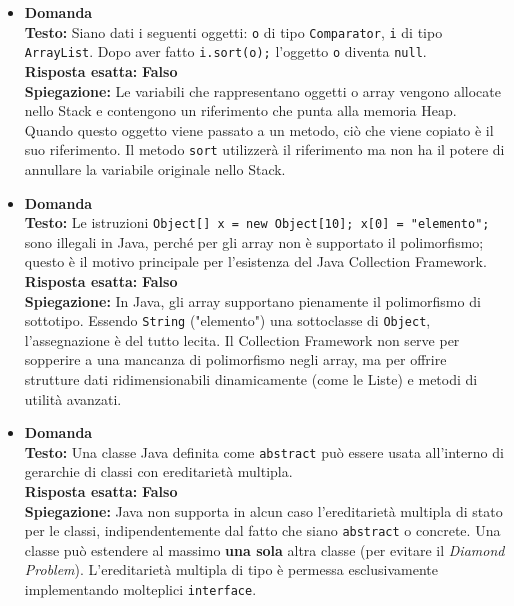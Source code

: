 \documentclass[12pt, a4paper]{article}
\begin{document}
\begin{itemize}
    \item {}\textbf{Domanda \thedomanda} \\
    \textbf{Testo:} Siano dati i seguenti oggetti: \texttt{o} di tipo \texttt{Comparator}, \texttt{i} di tipo \texttt{ArrayList}. Dopo aver fatto \texttt{i.sort(o);} l'oggetto \texttt{o} diventa \texttt{null}. \\
    \textbf{Risposta esatta:} \textbf{Falso} \\
    \textbf{Spiegazione:} Le variabili che rappresentano oggetti o array vengono allocate nello Stack e contengono un riferimento che punta alla memoria Heap. Quando questo oggetto viene passato a un metodo, ciò che viene copiato è il suo riferimento. Il metodo \texttt{sort} utilizzerà il riferimento ma non ha il potere di annullare la variabile originale nello Stack.
    \vspace{0.3cm}

    \item {}\textbf{Domanda \thedomanda} \\
    \textbf{Testo:} Le istruzioni \texttt{Object[] x = new Object[10]; x[0] = "elemento";} sono illegali in Java, perché per gli array non è supportato il polimorfismo; questo è il motivo principale per l'esistenza del Java Collection Framework. \\
    \textbf{Risposta esatta:} \textbf{Falso} \\
    \textbf{Spiegazione:} In Java, gli array supportano pienamente il polimorfismo di sottotipo. Essendo \texttt{String} ("elemento") una sottoclasse di \texttt{Object}, l'assegnazione è del tutto lecita. Il Collection Framework non serve per sopperire a una mancanza di polimorfismo negli array, ma per offrire strutture dati ridimensionabili dinamicamente (come le Liste) e metodi di utilità avanzati.
    \vspace{0.3cm}

    \item {}\textbf{Domanda \thedomanda} \\
    \textbf{Testo:} Una classe Java definita come \texttt{abstract} può essere usata all'interno di gerarchie di classi con ereditarietà multipla. \\
    \textbf{Risposta esatta:} \textbf{Falso} \\
    \textbf{Spiegazione:} Java non supporta in alcun caso l'ereditarietà multipla di stato per le classi, indipendentemente dal fatto che siano \texttt{abstract} o concrete. Una classe può estendere al massimo \textbf{una sola} altra classe (per evitare il \textit{Diamond Problem}). L'ereditarietà multipla di tipo è permessa esclusivamente implementando molteplici \texttt{interface}.
    \vspace{0.3cm}


\end{itemize}
\end{document}
